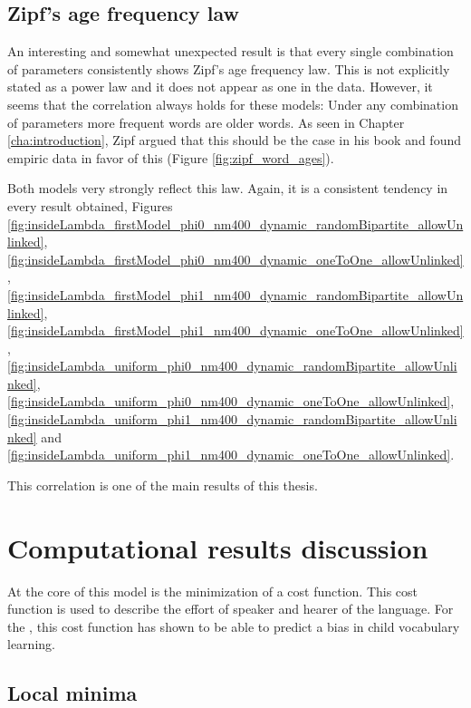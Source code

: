 \subsection{Zipf's age frequency law}
\label{sec:discussion_math_age-freq}

An interesting and somewhat unexpected result is that every single combination of parameters consistently shows Zipf's age frequency law.
This is not explicitly stated as a power law and it does not appear as one in the data.
However, it seems that the correlation always holds for these models: Under any combination of parameters more frequent words are older words.
As seen in Chapter \ref{cha:introduction}, Zipf argued that this should be the case in his book \cite{Zipf1949a} and found empiric data in favor of this (Figure \ref{fig:zipf_word_ages}).

Both models very strongly reflect this law.
Again, it is a consistent tendency in every result obtained, Figures \ref{fig:insideLambda_firstModel_phi0_nm400_dynamic_randomBipartite_allowUnlinked},  \ref{fig:insideLambda_firstModel_phi0_nm400_dynamic_oneToOne_allowUnlinked},  \ref{fig:insideLambda_firstModel_phi1_nm400_dynamic_randomBipartite_allowUnlinked},  \ref{fig:insideLambda_firstModel_phi1_nm400_dynamic_oneToOne_allowUnlinked},  \ref{fig:insideLambda_uniform_phi0_nm400_dynamic_randomBipartite_allowUnlinked},  \ref{fig:insideLambda_uniform_phi0_nm400_dynamic_oneToOne_allowUnlinked},  \ref{fig:insideLambda_uniform_phi1_nm400_dynamic_randomBipartite_allowUnlinked} and \ref{fig:insideLambda_uniform_phi1_nm400_dynamic_oneToOne_allowUnlinked}.

This correlation is one of the main results of this thesis.

\section{Computational results discussion}
\label{sec:discussion_comp}

At the core of this model is the minimization of a cost function.
This cost function is used to describe the effort of speaker and hearer of the language.
For the \firstmodel{}, this cost function has shown to be able to predict a bias in child vocabulary learning. \cite{Ferrer2017a} \cite{Carrera2021a}

\subsection{Local minima}
\label{sec:discussion_comp_minima}

